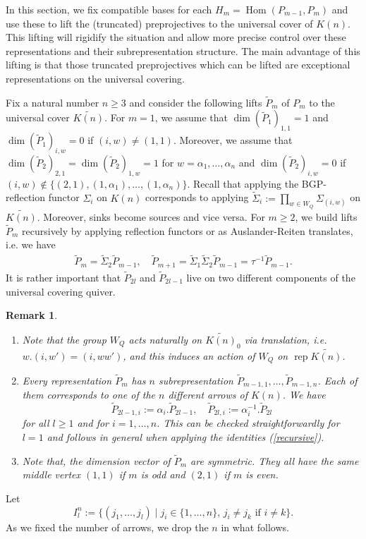 \documentclass{amsart}
\newtheorem{remark}[theorem]{Remark}
\newcommand{\rep}{\operatorname{rep}}
\newcommand{\Hom}{\operatorname{Hom}}
\begin{document}
In this section, we fix compatible bases for each $H_m=\Hom(P_{m-1},P_m)$ and use these to lift the (truncated) preprojectives to the universal cover of $K(n)$.
This lifting will rigidify the situation and allow more precise control over these representations and their subrepresentation structure.
The main advantage of this lifting is that those truncated preprojectives which can be lifted are exceptional representations on the universal covering.

Fix a natural number $n\geq 3$ and consider the following lifts $\tilde P_m$  of $P_m$ to the universal cover $\widetilde{K(n)}$.
For $m=1$, we assume that $\dim(\tilde P_1)_{1,1}=1$ and $\dim (\tilde P_1)_{i,w}=0$ if $(i,w)\neq (1,1)$.
Moreover, we assume that $\dim (\tilde P_2)_{2,1}=\dim (\tilde P_2)_{1,w}=1$ for $w=\alpha_1,\ldots,\alpha_n$ and $\dim (\tilde P_2)_{i,w}=0$ if $(i,w)\notin\{(2,1),(1,\alpha_1),\ldots,(1,\alpha_n)\}$.
Recall that applying the BGP-reflection functor $\Sigma_i$ on $K(n)$ corresponds to applying $\tilde\Sigma_i:=\prod_{w\in W_Q}\Sigma_{(i,w)}$ on $\widetilde{K(n)}$.
Moreover, sinks become sources and vice versa.
For $m\geq 2$, we build lifts $\tilde P_m$ recursively by applying reflection functors or as Auslander-Reiten translates, i.e. we have
\begin{align}
  \label{recursive}
  \tilde P_m=\tilde\Sigma_2 \tilde P_{m-1},\quad\tilde P_{m+1}=\tilde\Sigma_{1}\tilde\Sigma_2\tilde P_{m-1}=\tau^{-1} \tilde P_{m-1}.
\end{align}
It is rather important that $\tilde P_{2l}$ and $\tilde P_{2l-1}$ live on two different components of the universal covering quiver.

\begin{remark}
  \mbox{}
  \begin{enumerate}
    \item Note that the group $W_Q$ acts naturally on $\widetilde{K(n)}_0$ via translation, i.e. $w.(i,w')=(i,ww')$, and this induces an action of $W_Q$ on $\rep\widetilde{K(n)}$. 
    \item  Every representation $\tilde P_m$ has $n$ subrepresentation $\tilde P_{m-1,1},\ldots,\tilde P_{m-1,n}$. Each of them corresponds to one of the $n$ different arrows of $K(n)$. 	
		We have 
      $$\tilde P_{2l-1,i}:=\alpha_i.\tilde P_{2l-1},\quad \tilde P_{2l,i}:=\alpha_i^{-1}.\tilde P_{2l}$$
      for all $l\geq 1$ and for $i=1,\ldots,n$. This can be checked straightforwardly for $l=1$ and follows in general when applying the identities (\ref{recursive}). 

     
    \item Note that, the dimension vector of $\tilde P_m$ are symmetric. They all have the same middle vertex $(1,1)$ if $m$ is odd and $(2,1)$ if $m$ is even.
\end{enumerate}
\end{remark}
Let
$$I^n_l:=\{(j_1,\ldots,j_{l})\mid j_i\in\{1,\ldots,n\},\,j_i\neq j_k\text{ if }i\neq k\}.$$
As we fixed the number of arrows, we drop the $n$ in what follows. 
\end{document}
